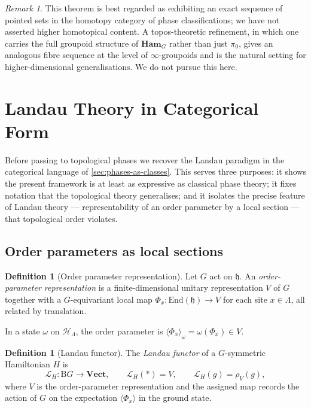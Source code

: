 \documentclass[12pt]{article}
\theoremstyle{plain}
\theoremstyle{definition}
\newtheorem{definition}[theorem]{Definition}
\theoremstyle{remark}
\newtheorem{remark}[theorem]{Remark}
\newcommand{\Ham}{\mathbf{Ham}}
\newcommand{\Vect}{\mathbf{Vect}}
\newcommand{\BG}{\mathrm{B}G}
\begin{document}
\begin{remark}
This theorem is best regarded as exhibiting an exact sequence of pointed sets in the
homotopy category of phase classifications; we have not asserted higher homotopical
content. A topos-theoretic refinement, in which one carries the full groupoid structure
of $\Ham_{G}$ rather than just $\pi_{0}$, gives an analogous fibre sequence at the
level of $\infty$-groupoids and is the natural setting for higher-dimensional
generalisations. We do not pursue this here.
\end{remark}

\section{Landau Theory in Categorical Form}
\label{sec:landau}

Before passing to topological phases we recover the Landau paradigm in the categorical
language of \cref{sec:phases-as-classes}. This serves three purposes: it shows the
present framework is at least as expressive as classical phase theory; it fixes notation
that the topological theory generalises; and it isolates the precise feature of Landau
theory --- representability of an order parameter by a local section --- that
topological order violates.

\subsection{Order parameters as local sections}

\begin{definition}[Order parameter representation]
\label{def:op-rep}
Let $G$ act on $\mathfrak{h}$. An \emph{order-parameter representation} is a
finite-dimensional unitary representation $V$ of $G$ together with a $G$-equivariant
local map $\Phi_{x}:\mathrm{End}(\mathfrak{h})\to V$ for each site $x\in\Lambda$, all
related by translation.
\end{definition}

In a state $\omega$ on $\mathcal{H}_{\Lambda}$, the order parameter is
$\langle\Phi_{x}\rangle_{\omega}=\omega(\Phi_{x})\in V$.

\begin{definition}[Landau functor]
\label{def:landau-functor}
The \emph{Landau functor} of a $G$-symmetric Hamiltonian $H$ is
\[
\mathcal{L}_{H}:\BG\to\Vect, \qquad
\mathcal{L}_{H}(\ast) = V, \qquad
\mathcal{L}_{H}(g) = \rho_{V}(g),
\]
where $V$ is the order-parameter representation and the assigned map records the action
of $G$ on the expectation $\langle\Phi_{x}\rangle$ in the ground state.
\end{definition}
\end{document}
